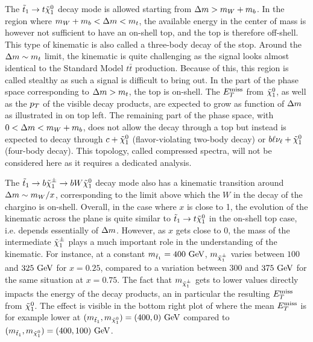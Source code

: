     The $\tilde{t}_1 \rightarrow t \tilde{\chi}_1^0$ decay mode is allowed starting from
    $\Delta m > m_{W} + m_{b}$. In the region where $m_{W} + m_{b} <
    \Delta m < m_{t}$, the available energy in the center of mass is however
    not sufficient to have an on-shell top, and the top is therefore off-shell.
    This type of kinematic is also called a three-body decay of the stop. Around
    the $\Delta m \sim m_{t}$ limit, the kinematic is quite challenging as the
    signal looks almost identical to the Standard Model $t\bar{t}$ production.
    Because of this, this region is called stealthy as such a signal is
    difficult to bring out. In the part of the phase space corresponding to
    $\Delta m > m_{t}$, the top is on-shell. The $E_T^\text{miss}$ from $\tilde{\chi}_1^0$,
    as well as the $p_T$ of the visible decay products, are expected to grow as
    function of $\Delta m$ as illustrated in  on top left.
    The remaining part of the phase space, with $0 < \Delta m < m_{W} +
    m_{b}$, does not allow the decay through a top but instead is expected to
    decay through $c+\tilde{\chi}_1^0$ (flavor-violating two-body decay) or
    $b\ell\nu_\ell+\tilde{\chi}_1^0$ (four-body decay).  This topology, called
    compressed spectra, will not be considered here as it requires a dedicated
    analysis.

    The $\tilde{t}_1 \rightarrow b \tilde{\chi}_1^\pm \rightarrow b W \tilde{\chi}_1^0$ decay
    mode also has a kinematic transition around $\Delta m \sim m_W/x$,
    corresponding to the limit above which the $W$ in the decay of the chargino
    is on-shell. Overall, in the case where $x$ is close to 1, the evolution of
    the kinematic across the plane is quite similar to $\tilde{t}_1 \rightarrow t
    \tilde{\chi}_1^0$ in the on-shell top case, i.e. depends essentially of
    $\Delta m$.  However, as $x$ gets close to 0, the mass of the intermediate
    $\tilde{\chi}_1^\pm$ plays a much important role in the understanding of the
    kinematic. For instance, at a constant $m_{\tilde{t}_1} = 400~\text{GeV}$,
    $m_{\tilde{\chi}_1^\pm}$ varies between $100$ and $325~\text{GeV}$ for $x = 0.25$,
    compared to a variation between $300$ and $375~\text{GeV}$ for the same situation
    at $x = 0.75$. The fact that $m_{\tilde{\chi}_1^\pm}$ gets to lower values
    directly impacts the energy of the decay products, an in particular the
    resulting $E_T^\text{miss}$ from $\tilde{\chi}_1^0$. The effect is visible in the bottom
    right plot of  where the mean $E_T^\text{miss}$ is for example
    lower at $(m_{\tilde{t}_1},m_{\tilde{\chi}_1^0}) = (400,0) ~\text{GeV}$ compared to
    $(m_{\tilde{t}_1}, m_{\tilde{\chi}_1^0}) = (400,100) ~\text{GeV}$.

